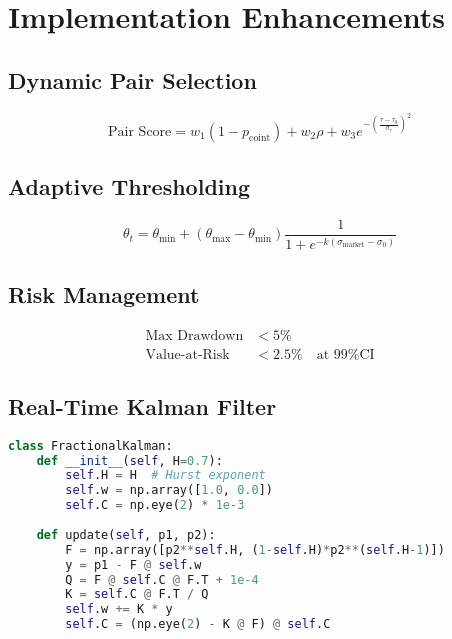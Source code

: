 \documentclass[12pt]{article}
\begin{document}
\section{Implementation Enhancements}

\subsection{Dynamic Pair Selection}
\begin{equation}
\text{Pair Score} = w_1(1 - p_{\text{coint}}) + w_2\rho + w_3e^{-\left(\frac{\tau - \tau_0}{\sigma_{\tau}}\right)^2}
\end{equation}

\subsection{Adaptive Thresholding}
\begin{equation}
\theta_t = \theta_{\min} + (\theta_{\max} - \theta_{\min}) \frac{1}{1 + e^{-k(\sigma_{\text{market}} - \sigma_0)}}
\end{equation}

\subsection{Risk Management}
\begin{align}
\text{Max Drawdown} &< 5\% \\
\text{Value-at-Risk} &< 2.5\% \quad \text{at 99\% CI}
\end{align}

\subsection{Real-Time Kalman Filter}
\begin{lstlisting}[language=Python, basicstyle=\small\ttfamily]
class FractionalKalman:
    def __init__(self, H=0.7):
        self.H = H  # Hurst exponent
        self.w = np.array([1.0, 0.0])
        self.C = np.eye(2) * 1e-3
        
    def update(self, p1, p2):
        F = np.array([p2**self.H, (1-self.H)*p2**(self.H-1)])
        y = p1 - F @ self.w
        Q = F @ self.C @ F.T + 1e-4
        K = self.C @ F.T / Q
        self.w += K * y
        self.C = (np.eye(2) - K @ F) @ self.C
\end{lstlisting}
\end{document}
